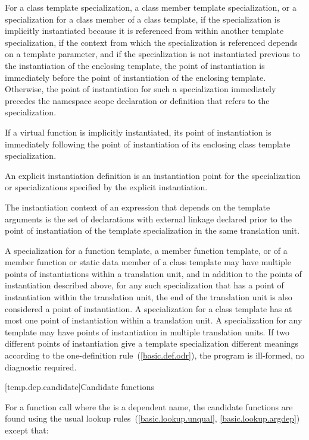 \pnum
For a class template specialization, a class member template specialization,
or a specialization for a class member of a class template,
if the specialization is implicitly instantiated because it is referenced
from within another template specialization,
if the context from which the specialization is referenced depends on a
template parameter,
and if the specialization is not instantiated previous to the instantiation of
the enclosing template,
the point of instantiation is immediately before the point of instantiation of
the enclosing template.
Otherwise, the point of instantiation for such a specialization immediately
precedes the namespace scope declaration
or definition that refers to the specialization.

\pnum
If a virtual function is implicitly instantiated, its point of instantiation
is immediately following the point of instantiation of its enclosing class
template specialization.

\pnum
An explicit instantiation definition is an instantiation
point for the specialization or specializations specified by the explicit
instantiation.

\pnum
The instantiation context of an expression that depends on the template
arguments is the set of declarations with external linkage declared prior to the
point of instantiation of the template specialization in the same translation
unit.

\pnum
A specialization for a function template, a member function template,
or of a member function or static data member of a class template may have
multiple points of instantiations within a translation unit, and in addition
to the points of instantiation described above, for any such specialization
that has a point of instantiation within the translation unit, the end of the
translation unit is also considered a point of instantiation.
A specialization for a class template has at most one point of instantiation
within a translation unit.
A specialization for any template may have points of instantiation in multiple
translation units.
If two different points of instantiation give a template specialization
different meanings according to the one-definition rule~(\ref{basic.def.odr}),
the program is ill-formed, no diagnostic required.

[temp.dep.candidate]{Candidate functions}

\pnum
{}%
For a function call where the  is a
dependent name,
the candidate functions are found using the usual lookup
rules~(\ref{basic.lookup.unqual}, \ref{basic.lookup.argdep}) except that:

